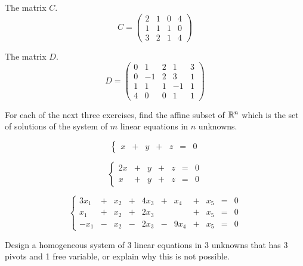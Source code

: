 \documentclass[elementsmain.tex]{subfiles}
\begin{document}
\begin{exercise} The matrix $C$.
\begin{equation*}
C = \begin{pmatrix} 2 & 1 & 0 & 4\\ 1 & 1 & 1 & 0 \\ 3 & 2 & 1 & 4 \end{pmatrix}
\end{equation*}
\end{exercise}

\begin{exercise} The matrix $D$.
\begin{equation*}
D = \begin{pmatrix} 0 & 1 & 2 & 1 & 3 \\
0 & -1 & 2 & 3 & 1 \\
1 & 1 & 1 & -1 & 1 \\
4 & 0 & 0 & 1 & 1 \end{pmatrix}
\end{equation*}
\end{exercise}

For each of the next three exercises, find the affine subset of $\mathbb{R}^n$ which is the set of solutions of the system of $m$ linear equations in $n$ unknowns.

\begin{exercise}
\begin{equation*}
\left\{ \begin{array}{rrrrrrr}
x & + & y & + & z & = & 0
\end{array}\right.
\end{equation*}
\end{exercise}

\begin{exercise}
\begin{equation*}
\left\{ \begin{array}{rrrrrrr}
2x & + & y & + & z & = & 0\\
x & + & y & + & z & = & 0
\end{array}\right.
\end{equation*}
\end{exercise}

\begin{exercise}
\begin{equation*}
\left\{ \begin{array}{rrrrrrrrrrr}
3x_1 & + & x_2 & + & 4x_3 & + & x_4 & + & x_5 & = & 0 \\
x_1 & + & x_2 & + & 2x_3 &  & & + & x_5 & = & 0 \\
-x_1 & - & x_2 & - & 2x_3 & - & 9x_4 & + & x_5 & = & 0 
\end{array}\right.
\end{equation*}
\end{exercise}

\begin{exercise}
Design a homogeneous system of $3$ linear equations in $3$ unknowns that has 3 pivots and 1 free variable, or explain why this is not possible.
\end{exercise}



\clearpage
\end{document}
